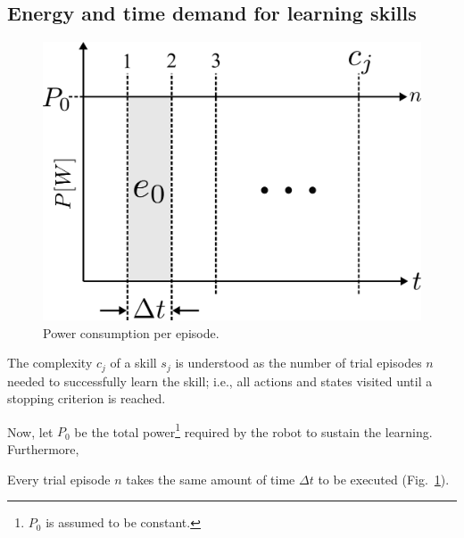 \subsection{Energy and time demand for learning skills}
\begin{figure}[!ht]
	\centering
	\includegraphics[width=0.9\columnwidth]{fig/power_per_episode.pdf}
	\caption{Power consumption per episode.}
	\label{fig:power_per_episode}
\end{figure}
\begin{tcolorbox}
\begin{definition}\label{definition:complexity} The complexity $c_j$ of a skill $ s_j $  is understood as the number of trial episodes $n$ needed to successfully learn the skill; i.e., all actions and states visited until a stopping criterion is reached. 
\end{definition}
\end{tcolorbox}
Now, let $P_0$ be the total power\footnote{$P_0$ is assumed to be constant.} required by the robot to sustain the learning. Furthermore,
\begin{tcolorbox}
\begin{assumption}\label{assumption:time} Every trial episode $n$ takes the same amount of time $\Delta t$ to be executed (Fig.~\ref{fig:power_per_episode}).
\end{assumption}
\end{tcolorbox}
